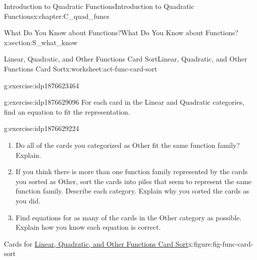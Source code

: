 \documentclass[oneside,10pt,]{book}
\numberwithin{equation}{chapter}
\begin{document}
\begin{chapterptx}{Introduction to Quadratic Functions}{}{Introduction to Quadratic Functions}{}{}{x:chapter:C_quad_funcs}
\begin{sectionptx}{What Do You Know about Functions?}{}{What Do You Know about Functions?}{}{}{x:section:S_what_know}
\begin{worksheet-subsection}{Linear, Quadratic, and Other Functions Card Sort}{}{Linear, Quadratic, and Other Functions Card Sort}{}{}{x:worksheet:act-func-card-sort}
\begin{divisionexercise}{3}{}{}{g:exercise:idp1876623464}
\end{divisionexercise}%
\begin{divisionexercise}{4}{}{}{g:exercise:idp1876629096}%
For each card in the Linear and Quadratic categories, find an equation to fit the representation.%
\end{divisionexercise}%
\begin{divisionexercise}{5}{}{}{g:exercise:idp1876629224}%
\begin{enumerate}[font=\bfseries,label=(\alph*),ref=\alph*]
\item{}Do all of the cards you categorized as Other fit the same function family? Explain.%
\item{}If you think there is more than one function family represented by the cards you sorted as Other, sort the cards into piles that seem to represent the same function family. Describe each category. Explain why you sorted the cards as you did.%
\item{}Find equations for as many of the cards in the Other category as possible. Explain how you know each equation is correct.%
\end{enumerate}
\end{divisionexercise}%
\clearpage
\begin{figureptx}{Cards for \hyperref[x:worksheet:act-func-card-sort]{Linear, Quadratic, and Other Functions Card Sort}}{x:figure:fig-func-card-sort}{}%
\begin{image}{0}{1}{0}%

\end{image}
\end{figureptx}
\end{worksheet-subsection}
\end{sectionptx}
\end{chapterptx}
\end{document}
